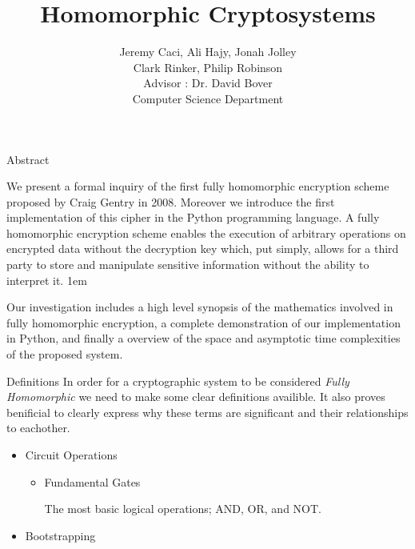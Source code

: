 \documentclass[a0,portrait]{a0poster}
\title{Homomorphic Cryptosystems}
\author{
Jeremy Caci, Ali Hajy, Jonah Jolley\\
Clark Rinker, Philip Robinson\\
Advisor : Dr. David Bover\\
Computer Science Department
}
\begin{document}
\maketitle

\def\fh{{\em Fully Homomorphic}\xspace}

\begin{multicols}{2}
\begin{slide}{Abstract}

We present a formal inquiry of the first fully homomorphic encryption scheme proposed by Craig Gentry in 2008. Moreover we introduce the first implementation of this cipher in the Python programming language. A fully homomorphic encryption scheme enables the execution of arbitrary operations on encrypted data without the decryption key which, put simply, allows for a third party to  store and manipulate sensitive information without the ability to interpret it. 
\parskip 1em

Our investigation includes a high level synopsis of the mathematics involved in fully homomorphic encryption, a complete demonstration of our implementation in Python, and finally a overview of the space and asymptotic time complexities of the proposed system. 

\end{slide}

\begin{slide}{Definitions}
In order for a cryptographic system to be considered \fh we need to make some clear definitions availible. It also proves benificial to clearly express why these terms are significant and their relationships to eachother. 

\begin{itemize}
\item Circuit Operations
\begin{itemize}
\item Fundamental Gates

  The most basic logical operations; AND, OR, and NOT. 
\end{itemize}
\item Bootstrapping


\end{itemize}
\end{slide}
\end{multicols}
\end{document}
